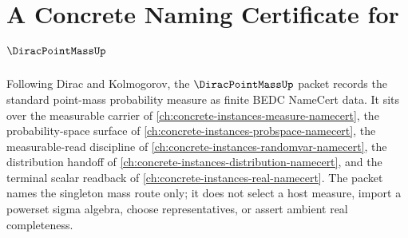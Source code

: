 \chapter{A Concrete Naming Certificate for $\DiracPointMassUp$}
\label{ch:concrete-instances-dirac-point-mass-namecert}

Following Dirac and Kolmogorov, the $\DiracPointMassUp$ packet records the standard point-mass probability measure as finite BEDC NameCert data. It sits over the measurable carrier of \autoref{ch:concrete-instances-measure-namecert}, the probability-space surface of \autoref{ch:concrete-instances-probspace-namecert}, the measurable-read discipline of \autoref{ch:concrete-instances-randomvar-namecert}, the distribution handoff of \autoref{ch:concrete-instances-distribution-namecert}, and the terminal scalar readback of \autoref{ch:concrete-instances-real-namecert}. The packet names the singleton mass route only; it does not select a host measure, import a powerset sigma algebra, choose representatives, or assert ambient real completeness.

